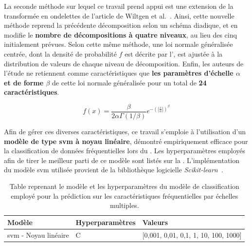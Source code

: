 La seconde méthode sur lequel ce travail prend appui est une extension de la transformée en ondelettes de l'article de Wiltgen et al.~\cite{Halimi2017a}. Ainsi, cette nouvelle méthode reprend la précédente décomposition selon un schéma diadique, et en modifie le \textbf{nombre de décompositions à quatre niveaux}, au lieu des cinq initialement prévues. Selon cette même méthode, une loi normale généralisée centrée, dont la densité de probabilité $f$ est décrite par l', est ajustée à la distribution de valeurs de chaque niveau de décomposition. Enfin, les auteurs de l'étude ne retiennent comme caractéristiques que \textbf{les paramètres d'échelle $\alpha$ et de forme $\beta$} de cette loi normale généralisée pour un total de \textbf{24 caractéristiques}.\par

\begin{equation}
    f(x)= \frac{\beta}{2\alpha\Gamma(1/\beta)} e^{-\left(|\frac{x}{\alpha}|\right)^\beta}
    \label{eq:image_improvement_ggd}
\end{equation}

Afin de gérer ces diverses caractéristiques, ce travail s'emploie à l'utilisation d'un \textbf{modèle de type \gls{svm} à noyau linéaire}, démontré empiriquement efficace pour la classification de données fréquentielles lors du . Les hyperparamètres employés afin de tirer le meilleur parti de ce modèle sont listés sur la . L'implémentation du modèle \gls{svm} utilisée provient de la bibliothèque logicielle \textit{Scikit-learn}~\cite{pedregosa2011}.\par

\begin{table}[H]
    \centering
    \begin{tabular}{lll}
        \toprule
        \textbf{Modèle}                                 & \textbf{Hyperparamètres}  & \textbf{Valeurs}                          \\ \midrule
        \gls{svm} - Noyau linéaire                      & C                         & [0,001, 0,01, 0,1, 1, 10, 100, 1000]      \\ 
        \bottomrule 
    \end{tabular} 
    \caption{Table reprenant le modèle et les hyperparamètres du modèle de classification employé pour la prédiction sur les caractéristiques fréquentielles par échelles multiples.}
    \label{tab:parameters_image_improvement_multiscale_frequency}
\end{table}\par

